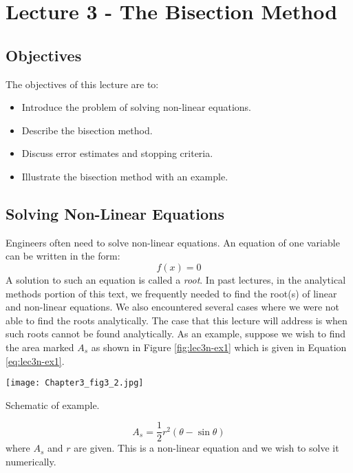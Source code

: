 \chapter{Lecture 3 - The Bisection Method}
\label{ch:lec3n}
\section{Objectives}
The objectives of this lecture are to:
\begin{itemize}
\item Introduce the problem of solving non-linear equations.
\item Describe the bisection method.
\item Discuss error estimates and stopping criteria.
\item Illustrate the bisection method with an example.
\end{itemize}
\setcounter{lstannotation}{0}

\section{Solving Non-Linear Equations}
Engineers often need to solve non-linear equations.  An equation of one variable can be written in the form:
\begin{equation}
f(x) = 0
\end{equation}
A solution to such an equation is called a \emph{root}.  In past lectures, in the analytical methods portion of this text, we frequently needed to find the root(s) of linear and non-linear equations.  We also encountered several cases where we were not able to find the roots analytically.
The case that this lecture will address is when such roots cannot be found analytically.  As an example, suppose we wish to find the area marked $A_s$ as shown in Figure \ref{fig:lec3n-ex1} which is given in Equation \ref{eq:lec3n-ex1}.
\begin{marginfigure}
\texttt{[image: Chapter3\_fig3\_2.jpg]}
\caption{Schematic of example.}
\label{fig:lec3n-ex1}
\end{marginfigure}
\begin{equation}
A_s = \frac{1}{2}r^2\left(\theta - \sin{\theta}\right)
\label{eq:lec3n-ex1}
\end{equation}
where $A_s$ and $r$ are given.  This is a non-linear equation and we wish to solve it numerically.

